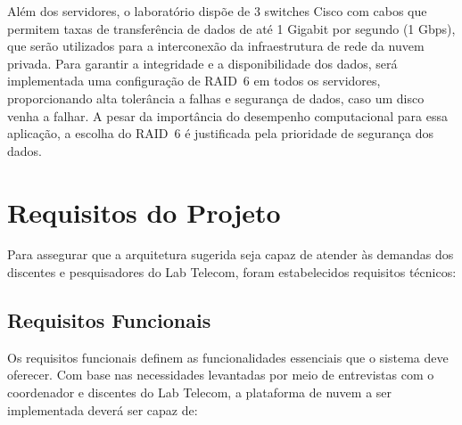 Além dos servidores, o laboratório dispõe de 3 switches Cisco com cabos que permitem taxas de transferência de dados de até 1 Gigabit por segundo (1 Gbps), que serão utilizados para a interconexão da infraestrutura de rede da nuvem privada. Para garantir a integridade e a disponibilidade dos dados, será implementada uma configuração de RAID~6 em todos os servidores, proporcionando alta tolerância a falhas e segurança de dados, caso um disco venha a falhar. A pesar da importância do desempenho computacional para essa aplicação, a escolha do RAID~6 é justificada pela prioridade de segurança dos dados.

\section{Requisitos do Projeto}
Para assegurar que a arquitetura sugerida seja capaz de atender às demandas dos discentes e pesquisadores do Lab Telecom, foram estabelecidos requisitos técnicos:

\subsection{Requisitos Funcionais}
Os requisitos funcionais definem as funcionalidades essenciais que o sistema deve oferecer. Com base nas necessidades levantadas por meio de entrevistas com o coordenador e discentes do Lab Telecom, a plataforma de nuvem a ser implementada deverá ser capaz de:


